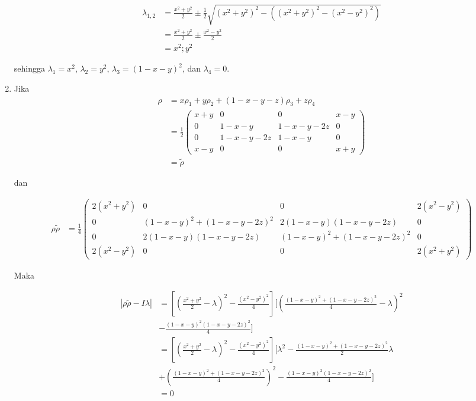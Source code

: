\begin{enumerate}
	\begin{equation}
		\begin{aligned}
			\lambda_{1,2}
			&=\frac{x^2+y^2}{2}\pm\frac{1}{2}\sqrt{(x^2+y^2)^2-((x^2+y^2)^2-(x^2-y^2)^2)}\\
			&=\frac{x^2+y^2}{2}\pm\frac{x^2-y^2}{2}\\
			&=x^2; y^2
		\end{aligned}
	\end{equation}
	
	sehingga $\lambda_1=x^2$, $\lambda_2=y^2$, $\lambda_3=(1-x-y)^2$, dan $\lambda_4=0$.
	
	\item Jika
	\begin{equation}
		\begin{aligned}
			\rho
			&=x\rho_1+y\rho_2+(1-x-y-z)\rho_3+z\rho_4\\
			&=\frac{1}{2}
			\begin{pmatrix}
				x+y&0&0&x-y\\
				0&1-x-y&1-x-y-2z&0\\
				0&1-x-y-2z&1-x-y&0\\
				x-y&0&0&x+y
			\end{pmatrix}\\
			&=\tilde{\rho}
		\end{aligned}
	\end{equation}
	
	dan
	
	\begin{equation}
		\begin{aligned}
			\rho \tilde{\rho}
			&=\frac{1}{4}
			\begin{pmatrix}
				2(x^2+y^2)&0&0&2(x^2-y^2)\\
				0&(1-x-y)^2+(1-x-y-2z)^2&2(1-x-y)(1-x-y-2z)&0\\
				0&2(1-x-y)(1-x-y-2z)&(1-x-y)^2+(1-x-y-2z)^2&0\\
				2(x^2-y^2)&0&0&2(x^2+y^2)
			\end{pmatrix}
		\end{aligned}
	\end{equation}
	
	Maka
	
	\begin{equation}
		\begin{aligned}
			|\rho \tilde{\rho}-I\lambda|
			&=[(\frac{x^2+y^2}{2}-\lambda)^2-\frac{(x^2-y^2)^2}{4}][(\frac{(1-x-y)^2+(1-x-y-2z)^2}{4}-\lambda)^2\\
			&-\frac{(1-x-y)^2(1-x-y-2z)^2}{4}]\\
			&=[(\frac{x^2+y^2}{2}-\lambda)^2-\frac{(x^2-y^2)^2}{4}][\lambda^2-\frac{(1-x-y)^2+(1-x-y-2z)^2}{2}\lambda\\
			&+(\frac{(1-x-y)^2+(1-x-y-2z)^2}{4})^2-\frac{(1-x-y)^2(1-x-y-2z)^2}{4}]\\
			&=0
		\end{aligned}
	\end{equation}
	

\end{enumerate}
